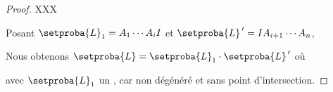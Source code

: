 \begin{proof}
	
	
	 
    XXX
    
   
	Posant
	$\setproba{L}_1 = A_1 \cdots A_i I$
    et
    $\setproba{L}^{\,\prime} = I A_{i+1} \cdots A_n$,
    
    \smallskip
    
    Nous obtenons $\setproba{L} = \setproba{L}_1 \cdot \setproba{L}^{\,\prime}$ où

    avec $\setproba{L}_1$ un \ngone, car non dégénéré et sans point d'intersection.
    
    
    
\end{proof}









